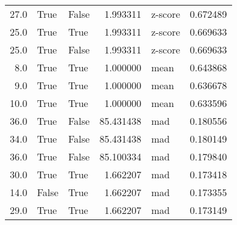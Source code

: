 \begin{table}[htp]
\begin{tabular}{rllrlr}
        27.0 &           True &       False &   1.993311 &     z-score &  0.672489 \\
        25.0 &           True &        True &   1.993311 &     z-score &  0.669633 \\
        25.0 &           True &       False &   1.993311 &     z-score &  0.669633 \\
         8.0 &           True &        True &   1.000000 &        mean &  0.643868 \\
         9.0 &           True &        True &   1.000000 &        mean &  0.636678 \\
        10.0 &           True &        True &   1.000000 &        mean &  0.633596 \\
        36.0 &           True &       False &  85.431438 &         mad &  0.180556 \\
        34.0 &           True &       False &  85.431438 &         mad &  0.180149 \\
        36.0 &           True &       False &  85.100334 &         mad &  0.179840 \\
        30.0 &           True &        True &   1.662207 &         mad &  0.173418 \\
        14.0 &          False &        True &   1.662207 &         mad &  0.173355 \\
        29.0 &           True &        True &   1.662207 &         mad &  0.173149 \\
\bottomrule
\end{tabular}
\end{table}
